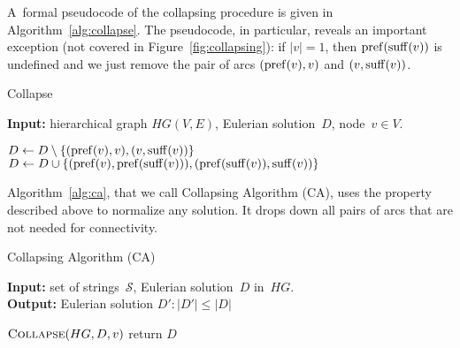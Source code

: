 A~formal pseudocode of the collapsing procedure is given in Algorithm~\ref{alg:collapse}. The pseudocode, in particular, reveals an important exception (not covered in Figure~\ref{fig:collapsing}):
if $|v|=1$, then $\operatorname{pref}(\operatorname{suff}(v))$ is undefined and we just remove the pair of arcs $(\operatorname{pref}(v), v)$ and $(v, \operatorname{suff}(v))$.


\begin{algorithm}[!ht]
\caption{Collapse}\label{alg:collapse}
\hspace*{\algorithmicindent} \textbf{Input:} hierarchical graph $HG(V,E)$, Eulerian solution~$D$, node~$v \in V$.
\begin{algorithmic}[1]
\State\label{alg:col} $D \gets D \setminus \{(\operatorname{pref}(v), v), (v, \operatorname{suff}(v))\}$
\State $D \gets D \cup \{(\operatorname{pref}(v), \operatorname{pref}(\operatorname{suff}(v))), (\operatorname{pref}(\operatorname{suff}(v)), \operatorname{suff}(v))\}$
\EndIf
\EndIf
\end{algorithmic}
\end{algorithm}

Algorithm~\ref{alg:ca}, that we call Collapsing Algorithm (CA), uses the property described above to normalize any solution.
It drops down all pairs of arcs that are not needed for connectivity.



\begin{algorithm}[!ht]
\caption{Collapsing Algorithm (CA)}\label{alg:ca}
\hspace*{\algorithmicindent} \textbf{Input:} set of strings~$\mathcal{S}$, Eulerian solution~$D$ in~$HG$.\\
\hspace*{\algorithmicindent} \textbf{Output:} Eulerian solution $D'\colon |D'|\leq|D|$
\begin{algorithmic}[1]
\label{alg:ca_for}
\State $\text{\sc Collapse}(HG, D, v)$
\EndWhile
\EndFor
\EndFor
\State return $D$
\end{algorithmic}
\end{algorithm}

